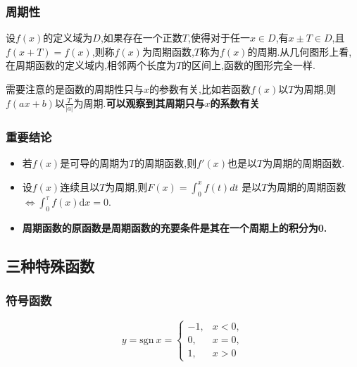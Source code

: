 \documentclass[12pt, a4paper, oneside, UTF8]{ctexbook}  %
\begin{document}
\begin{sloppypar}
    \subsubsection{周期性}
    \begin{defn}{}{}
        设$f(x)$的定义域为$D$,如果存在一个正数$T$,使得对于任一$x \in D$,有$x \pm T \in D$,且$f(x+T)=f(x)$,则称$f(x)$为周期函数,$T$称为$f(x)$的周期.从几何图形上看,在周期函数的定义域内,相邻两个长度为$T$的区间上,函数的图形完全一样.
    \end{defn}
    需要注意的是函数的周期性只与$x$的参数有关,比如若函数$f(x)$以$T$为周期,则$f(ax+b)$以$\frac{T}{|a|}$为周期.\textbf{可以观察到其周期只与$x$的系数有关}
    \subsubsection{重要结论}
    \begin{itemize}
        \item 若$f(x)$是可导的周期为$T$的周期函数,则$f'(x)$也是以$T$为周期的周期函数.
        \item 设$f(x)$连续且以$T$为周期,则$F(x)=\int_0 ^x f(t)dt$ 是以$T$为周期的周期函数$\Leftrightarrow\int_{0}^{\tau}f(x)\mathrm{d}x=0.$
        \item \textbf{周期函数的原函数是周期函数的充要条件是其在一个周期上的积分为0.}
    \end{itemize}
    \subsection{三种特殊函数}
    \subsubsection{符号函数}
    $$
        y=\text{sgn} \ x=\begin{cases}-1,&x<0,\\0,&x=0,\\1,&x>0\end{cases}
    $$
    \begin{center}


\end{center}
\end{sloppypar}
\end{document}
